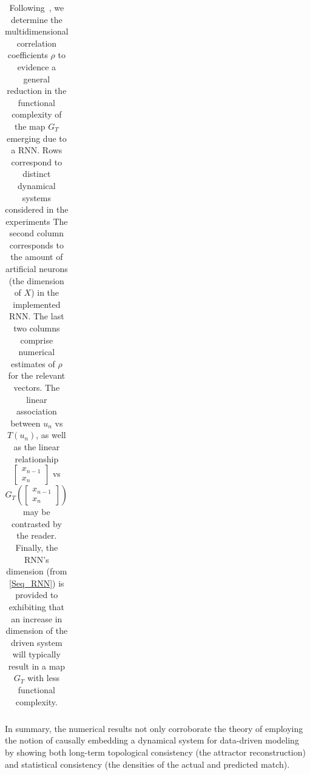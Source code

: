 \begin{table}
{\begin{tabular}{|c|c| c c |}
           \bottomrule
                \end{tabular}}\label{Table_FC}%
     \caption{
              Following~\cite{manjunath2021universal}, we determine the multidimensional correlation coefficients $\rho$ to evidence a general reduction in the functional complexity of the map $G_T$ emerging due to a RNN. Rows correspond to distinct dynamical systems considered in the experiments
              The second column corresponds to the amount of artificial neurons (the dimension of $X$) in the implemented RNN.
              The last two columns comprise numerical estimates of $\rho$ for the relevant vectors. The linear association between $u_n$ vs $T(u_{n})$, as well as the linear relationship 
              $\begin{bmatrix}
                x_{n-1}\\
                x_n
            \end{bmatrix}$ vs 
            $G_T 
            \left({\begin{bmatrix}
                x_{n-1}\\
                x_n
            \end{bmatrix}}\right)$ 
              may be contrasted by the reader. 
              Finally, the RNN's dimension (from \eqref{Seq_RNN})
              is provided to exhibiting that an increase in dimension of the driven system will 
              typically result in a map $G_T$ with less functional complexity.}
      \end{table}\label{tbl_attractorsPearson}

In summary, the numerical results not only corroborate the theory of employing the notion of causally embedding a dynamical system for data-driven modeling by showing both long-term topological consistency (the attractor reconstruction) and statistical consistency (the densities of the actual and predicted match).